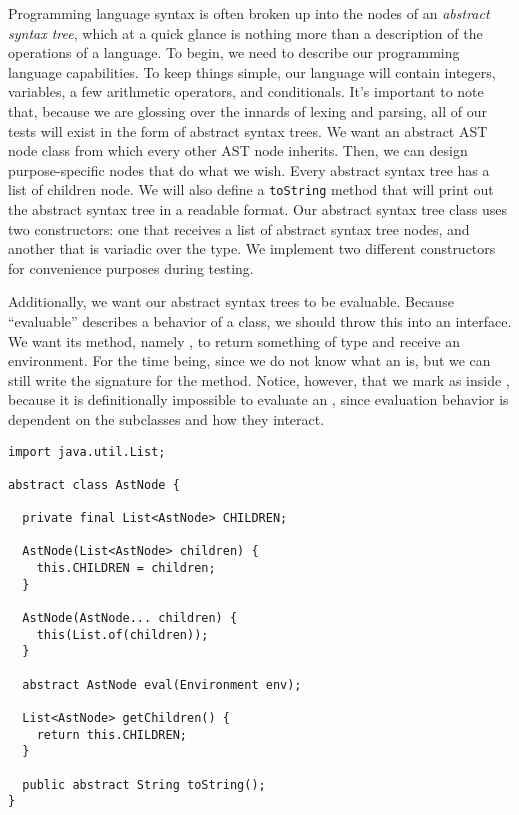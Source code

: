 Programming language syntax is often broken up into the nodes of an \emph{abstract syntax tree}, which at a quick glance is nothing more than a description of the operations of a language. To begin, we need to describe our programming language capabilities. To keep things simple, our language will contain integers, variables, a few arithmetic operators, and conditionals. It's important to note that, because we are glossing over the innards of lexing and  parsing, all of our tests will exist in the form of abstract syntax trees. We want an abstract AST node class from which every other AST node inherits. Then, we can design purpose-specific nodes that do what we wish. Every abstract syntax tree has a list of children node. We will also define a \texttt{toString} method that will print out the abstract syntax tree in a readable format. Our abstract syntax tree class uses two constructors: one that receives a list of abstract syntax tree nodes, and another that is variadic over the  type. We implement two different constructors for convenience purposes during testing.

Additionally, we want our abstract syntax trees to be evaluable. Because ``evaluable'' describes a behavior of a class, we should throw this into an interface. We want its method, namely , to return something of type  and receive an environment. For the time being, since we do not know what an  is, but we can still write the signature for the  method. Notice, however, that we mark  as  inside , because it is definitionally impossible to evaluate an , since evaluation behavior is dependent on the subclasses and how they interact.

\begin{lstlisting}[language=MyJava]
import java.util.List;

abstract class AstNode {

  private final List<AstNode> CHILDREN;  
 
  AstNode(List<AstNode> children) { 
    this.CHILDREN = children; 
  }

  AstNode(AstNode... children) { 
    this(List.of(children)); 
  }

  abstract AstNode eval(Environment env);

  List<AstNode> getChildren() { 
    return this.CHILDREN; 
  }

  public abstract String toString();
}
\end{lstlisting}


